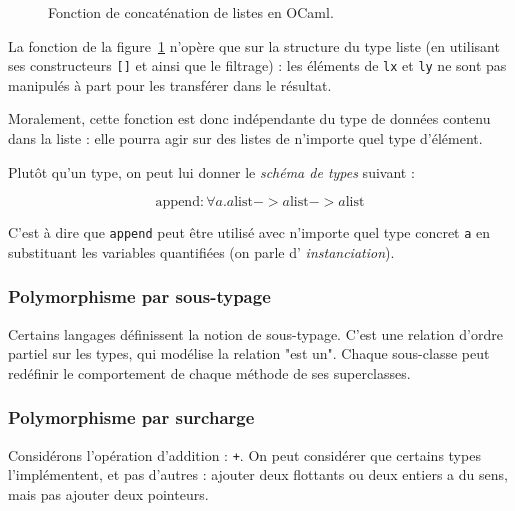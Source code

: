 \cite{Milner78}

\cite{PascalNoEscape}

\begin{figure}
  \caption{Fonction de concaténation de listes en OCaml.}
  \label{fig:listappend}
\end{figure}

La fonction de la figure~\ref{fig:listappend} n'opère que sur la structure du type
liste (en utilisant ses constructeurs \texttt{{[}{]}} et \listcons ainsi que
le filtrage) : les éléments de \texttt{lx} et \texttt{ly} ne sont pas manipulés
à part pour les transférer dans le résultat.

Moralement, cette fonction est donc indépendante du type de données contenu dans
la liste : elle pourra agir sur des listes de n'importe quel type d'élément.

Plutôt qu'un type, on peut lui donner le \emph{schéma de types} suivant :

\[
  \textrm{append} : \forall a . a \textrm{list}
                             -> a \textrm{list}
                             -> a \textrm{list}
\]

C'est à dire que \texttt{append} peut être utilisé avec n'importe quel type
concret \texttt{a} en substituant les variables quantifiées (on parle d'
\emph{instanciation}).

\subsubsection{Polymorphisme par sous-typage}


Certains langages définissent la notion de sous-typage. C'est une relation
d'ordre partiel sur les types, qui modélise la relation "est un". Chaque
sous-classe peut redéfinir le comportement de chaque méthode de ses
superclasses.

\subsubsection{Polymorphisme par surcharge}

Considérons l'opération d'addition : \texttt{+}. On peut considérer que certains
types l'implémentent, et pas d'autres : ajouter deux flottants ou deux entiers a
du sens, mais pas ajouter deux pointeurs.


